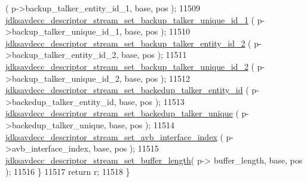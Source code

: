 \begin{DoxyCode}
      ( p->backup\_talker\_entity\_id\_1, base, pos );
11509         \hyperlink{group__descriptor__stream_ga6bafa59427d44f43f24fce065d171a31}{jdksavdecc\_descriptor\_stream\_set\_backup\_talker\_unique\_id\_1}
      ( p->backup\_talker\_unique\_id\_1, base, pos );
11510         \hyperlink{group__descriptor__stream_gaee2d5340ca32434a012a7f50d8249f2d}{jdksavdecc\_descriptor\_stream\_set\_backup\_talker\_entity\_id\_2}
      ( p->backup\_talker\_entity\_id\_2, base, pos );
11511         \hyperlink{group__descriptor__stream_gaa0d22ac68eb83f42655eaeb0072948ec}{jdksavdecc\_descriptor\_stream\_set\_backup\_talker\_unique\_id\_2}
      ( p->backup\_talker\_unique\_id\_2, base, pos );
11512         \hyperlink{group__descriptor__stream_gaf9ded75d56e6999d12dc6b3858e81f88}{jdksavdecc\_descriptor\_stream\_set\_backedup\_talker\_entity\_id}
      ( p->backedup\_talker\_entity\_id, base, pos );
11513         \hyperlink{group__descriptor__stream_gac8d349c9214f43a0a98fa3ab63611398}{jdksavdecc\_descriptor\_stream\_set\_backedup\_talker\_unique}
      ( p->backedup\_talker\_unique, base, pos );
11514         \hyperlink{group__descriptor__stream_gad9f3d6db7080c05fd218dbba1d501c00}{jdksavdecc\_descriptor\_stream\_set\_avb\_interface\_index}
      ( p->avb\_interface\_index, base, pos );
11515         \hyperlink{group__descriptor__stream_ga9f3b0992c3e55d07e62a0f720537549b}{jdksavdecc\_descriptor\_stream\_set\_buffer\_length}( p->
      buffer\_length, base, pos );
11516     \}
11517     \textcolor{keywordflow}{return} r;
11518 \}
\end{DoxyCode}


